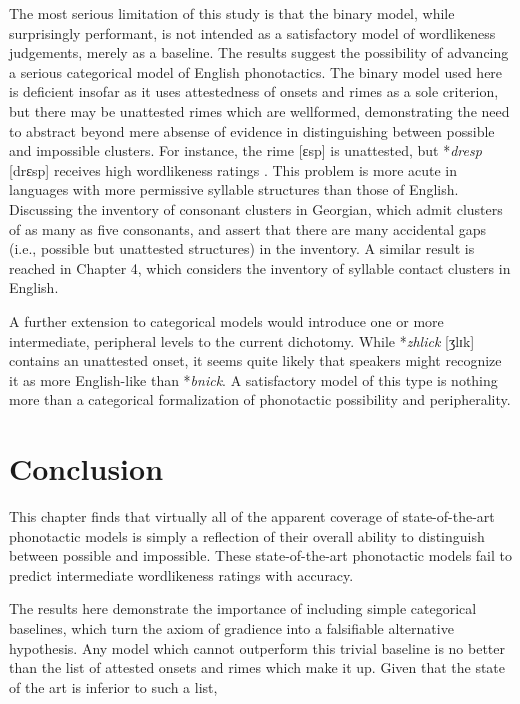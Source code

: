 The most serious limitation of this study is that the binary model, while surprisingly performant, is not intended as a satisfactory model of wordlikeness judgements, merely as a baseline. The results suggest the possibility of advancing a serious categorical model of English phonotactics. The binary model used here is deficient insofar as it uses attestedness of onsets and rimes as a sole criterion, but there may be unattested rimes which are wellformed, demonstrating the need to abstract beyond mere absense of evidence in distinguishing between possible and impossible clusters. For instance, the rime [ɛsp] is unattested, but *\emph{dresp} [drɛsp] receives high wordlikeness ratings \citep{Albright2009a}. This problem is more acute in languages with more permissive syllable structures than those of English. Discussing the inventory of consonant clusters in Georgian, which admit clusters of as many as five consonants, \citet{Fischer-Jorgensen1952} and \citet{Vogt1954} assert that there are many accidental gaps (i.e., possible but unattested structures) in the inventory. A similar result is reached in Chapter 4, which considers the inventory of syllable contact clusters in English. %

A further extension to categorical models would introduce one or more intermediate, peripheral levels to the current dichotomy. While *\emph{zhlick} [ʒlɪk] contains an unattested onset, it seems quite likely that speakers might recognize it as more English-like than *\emph{bnick}. A satisfactory model of this type is nothing more than a categorical formalization of phonotactic possibility and peripherality.

\section{Conclusion}

This chapter finds that virtually all of the apparent coverage of state-of-the-art phonotactic models is simply a reflection of their overall ability to distinguish between possible and impossible. These state-of-the-art phonotactic models fail to predict intermediate wordlikeness ratings with accuracy.

The results here demonstrate the importance of including simple categorical baselines, which turn the axiom of gradience into a falsifiable alternative hypothesis. Any model which cannot outperform this trivial baseline is no better than the list of attested onsets and rimes which make it up. Given that the state of the art is inferior to such a list, 


